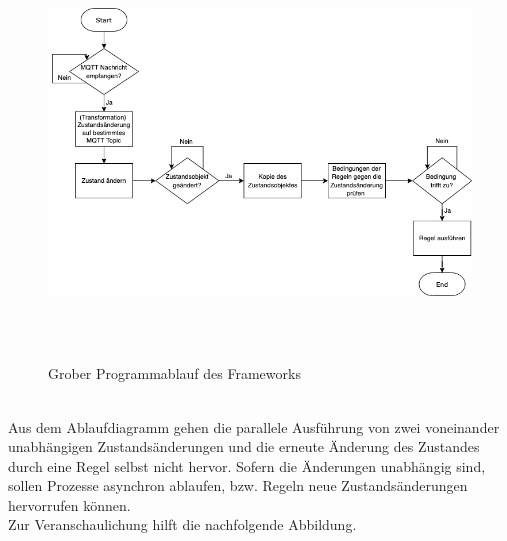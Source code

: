         \begin{figure}[hbt!]
            \centering
            \includegraphics[width=14cm,height=11cm,keepaspectratio]{images/Programmablauf_Framework.png}
            \caption{Grober Programmablauf des Frameworks}
            \label{fig:programmablauf_framework}
        \end{figure}
        \\
        Aus dem Ablaufdiagramm gehen die parallele Ausführung von zwei voneinander unabhängigen Zustandsänderungen und die 
        erneute Änderung des Zustandes durch eine Regel selbst nicht hervor. Sofern die Änderungen unabhängig 
        sind, sollen Prozesse asynchron ablaufen, bzw. Regeln neue Zustandsänderungen hervorrufen können. 
        \\
        Zur Veranschaulichung hilft die nachfolgende Abbildung. 
        